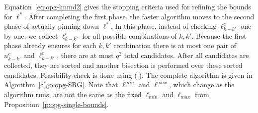 Equation~\eqref{eq:opg-lmmd2} gives the stopping criteria used for refining 
the bounds for $\ell^*$. After completing the first phase, the faster algorithm
moves to the second phase of actually pinning down $\ell^*$. In this phase, 
instead of checking $\ell_{k-k'}^c$ one by one, we collect $\ell_{k-k'}^c$ for
all possible combinations of $k, k'$. Because the first phase already ensures
for each $k, k'$ combination there is at most one pair of $n_{k-k'}^c$ and 
$\ell_{k-k'}^c$, there are 
at most $q^2$ total candidates. After all candidates are collected, they are 
sorted and another bisection is performed over these sorted candidates. 
Feasibility check is done using \isLFeasibleByTilingPartial($\cdot$). The 
complete algorithm is given in Algorithm~\ref{algo:opg-SRG}. Note that 
$\ell^{min}$ and $\ell^{max}$, which change as the algorithm runs, are not 
the same as the fixed $\ell_{min}$ and $\ell_{max}$ from 
Proposition~\ref{p:opg-single-bounds}. 
\newpage
\vspace*{-7mm}
